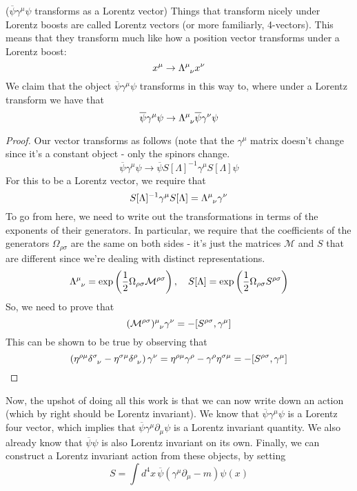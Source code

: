 \begin{claim}{($ \overline{\psi } \gamma ^ \mu \psi $ transforms as a Lorentz vector)}
Things that transform nicely under Lorentz boosts 
are called Lorentz vectors (or more 
familiarly, 4-vectors). This means that they 
transform much like how a position vector 
transforms under a Lorentz boost: 
\[
 x ^ \mu \to \Lambda \indices{^ \mu _ \nu } x ^ \nu  
\] 
We claim that the object $ \overline{\psi } \gamma ^ \mu \psi  $
transforms in this way to, where under a Lorentz 
transform we have that 
\[
 \overline{ \psi } \gamma ^ \mu \psi \to 
 \Lambda \indices{ ^ \mu _ \nu } \overline{ \psi } \gamma ^ \nu 
 \psi 
\]
\begin{proof} 
	Our vector transforms as follows (note that 
	the $ \gamma ^ \mu $ matrix doesn't change 
	since it's a constant object - only the spinors change.
\[
	\overline{ \psi } \gamma ^ \mu \psi \to \overline{ \psi } S [ \Lambda ] ^{ - 1} 
	\gamma ^ \mu S [ \Lambda ] \psi 
\]  For this to be a Lorentz vector, we require that 
\[
	S [ \Lambda ]^{ - 1} \gamma ^ \mu S [ \Lambda ] = \Lambda \indices{ ^ \mu _ \nu } \gamma ^ \nu  
\] To go from here, we need to 
write out the transformations in terms of the 
exponents of their generators. In particular, 
we require that the coefficients of the 
generators $ \Omega_{ \rho \sigma  }  $ are 
the same on both sides  - it's just the matrices $ \mathcal{ M } $
and $ S $ that are different since we're dealing with distinct 
representations. 
\[
	\Lambda \indices{ ^ \mu _ \nu } = \exp \left(  
	\frac{1}{2 } \Omega _{ \rho \sigma  }\mathcal{ M } ^{ \rho \sigma } \right)  , 
	\quad S[ \Lambda ] = \exp \left(  \frac{1}{2 } \Omega _{ \rho \sigma } 
	S ^{ \rho \sigma } \right) 
\] So, we need to prove that 
\[
	( \mathcal{ M  }^{ \rho \sigma } ) \indices{ ^ \mu _ \nu } \gamma ^ \nu 
	=- [ S ^{ \rho \sigma } , \gamma ^ \mu ] 
\] This can be shown to be true by observing that 
\[
 \left(  \eta ^{ \rho \mu }  \delta \indices{ ^ \sigma _ \nu }
  - \eta ^{ \sigma \mu } \delta \indices{ ^ \rho  _ \nu }  \right)  \gamma ^ \nu 
    = \eta ^{\rho \mu } \gamma ^{ \rho }  - \gamma ^{ \rho } \eta ^{ \sigma \mu } = 
    - [ S ^{ \rho \sigma } , \gamma ^{ \mu } ] 
\] 
\end{proof} 
\end{claim} 
Now, the upshot of doing all this 
work is that we can now write down 
an action (which by right should be Lorentz invariant). 
We know that $ \overline{\psi }  \gamma ^ \mu \psi $ is 
a Lorentz four vector, which implies that 
$ \overline{ \psi } \gamma ^ \mu \partial  _ \mu \psi $ 
is a Lorentz invariant quantity. We also already know that 
$ \overline{ \psi } \psi $  is also Lorentz invariant on its 
own. Finally, 
we can construct a Lorentz invariant action from these objects, 
by setting 
\[
	S = \int  d^ 4 x \, \overline{ \psi  } \left(  
	 \gamma ^ \mu \partial  _\mu  - m \right) \psi ( x) 
\] 

